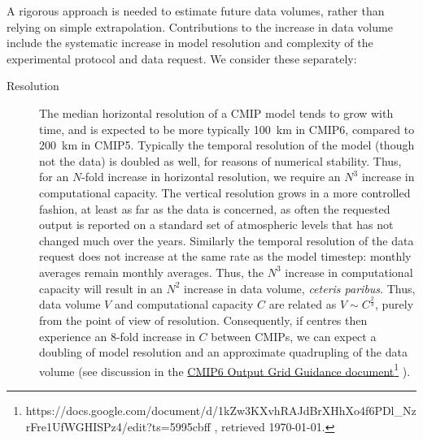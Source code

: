 \documentclass[gmd,manuscript]{copernicus}
\begin{document}
A rigorous approach is needed to estimate future data volumes, rather
than relying on simple extrapolation. Contributions to the increase in
data volume include the systematic increase in model resolution and
complexity of the experimental protocol and data request. We consider
these separately:

\begin{description}
\item[Resolution] The median horizontal resolution of a CMIP model
  tends to grow with time, and is expected to be more typically 100~km
  in CMIP6, compared to 200~km in CMIP5. Typically the temporal
  resolution of the model (though not the data) is doubled as well,
  for reasons of numerical stability. Thus, for an $N$-fold increase
  in horizontal resolution, we require an $N^3$ increase in
  computational capacity. The vertical resolution grows in a more
  controlled fashion, at least as far as the data is concerned, as
  often the requested output is reported on a standard set of
  atmospheric levels that has not changed much over the years.
  Similarly the temporal resolution of the data request does not
  increase at the same rate as the model timestep: monthly averages
  remain monthly averages. Thus, the $N^3$ increase in computational
  capacity will result in an $N^2$ increase in data volume,
  \emph{ceteris paribus}. Thus, data volume $V$ and computational
  capacity $C$ are related as $V \sim C^\frac23$, purely from the
  point of view of resolution. Consequently, if centres then
  experience an 8-fold increase in $C$ between CMIPs, we can expect a
  doubling of model resolution and an approximate quadrupling of the
  data volume (see discussion in the
  \href{https://docs.google.com/document/d/1kZw3KXvhRAJdBrXHhXo4f6PDl_NzrFre1UfWGHISPz4/edit?ts=5995cbff
  }{CMIP6 Output Grid Guidance
    document}\footnote{https://docs.google.com/document/d/1kZw3KXvhRAJdBrXHhXo4f6PDl\_NzrFre1UfWGHISPz4/edit?ts=5995cbff
    , retrieved \today.} ).


\end{description}
\end{document}
